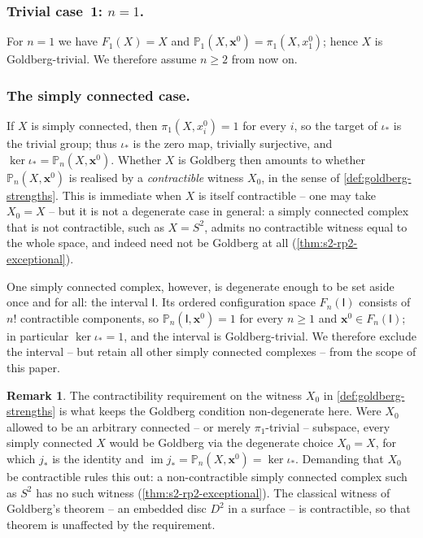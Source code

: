 \documentclass[reqno]{amsart}
\theoremstyle{definition}
\newtheorem{remark}[theorem]{Remark}
\newcommand\bfx{\mathbf{x}}
\newcommand{\PB}{\mathbb{P}}
\newcommand{\im}{\operatorname{im}}
\newcommand{\base}{\bfx^0}
\numberwithin{equation}{section}
\begin{document}
\subsubsection{Trivial case~1: \(n = 1\).}\label{subsubsection:n-equals-one}

For \(n = 1\) we have \(F_1 (X) = X\) and
\(\PB_1(X,\base) = \pi_1(X,x_1^0)\); hence
\(X\) is Goldberg-trivial. We
therefore assume \(n\geq 2\) from now on.

\subsubsection{The simply connected case.}\label{subsubsection:simply-connected}

If \(X\) is simply connected, then \(\pi_1(X,x_i^0) = 1\) for every
\(i\), so the target of \(\iota_\ast\) is the trivial group; thus
\(\iota_\ast\) is the zero map, trivially surjective, and
\(\ker\iota_\ast = \PB_n(X,\base)\). Whether \(X\) is Goldberg then
amounts to whether \(\PB_n(X,\base)\) is realised by a
\emph{contractible} witness \(X_0\), in the sense of
\cref{def:goldberg-strengths}. This is immediate when
\(X\) is itself contractible -- one may take \(X_0 = X\) -- but it is
not a degenerate case in general: a simply connected complex that
is not contractible, such as \(X = S^2\), admits no contractible
witness equal to the whole space, and indeed need not be Goldberg
at all (\cref{thm:s2-rp2-exceptional}).

One simply connected complex, however, is degenerate enough to
be set aside once and for all: the interval \(\mathsf{I}\). Its
ordered configuration space \(F_n(\mathsf{I})\) consists of
\(n!\) contractible components, so \(\PB_n(\mathsf{I},\base)=1\)
for every \(n\geq1\) and \(\base\in F_n(\mathsf{I})\); in
particular \(\ker\iota_\ast=1\), and the interval is
Goldberg-trivial. We therefore exclude the interval -- but
retain all other simply connected complexes -- from the scope
of this paper.

\begin{remark}\label{rem:simpler-X0}
The contractibility requirement on the witness \(X_0\) in
\cref{def:goldberg-strengths} is what keeps the Goldberg
condition non-degenerate here. Were \(X_0\) allowed to be an
arbitrary connected -- or merely \(\pi_1\)-trivial -- subspace, every
simply connected \(X\) would be Goldberg via the degenerate
choice \(X_0 = X\), for which \(j_\ast\) is the identity and
\(\im j_\ast = \PB_n(X,\base) = \ker\iota_\ast\). Demanding that
\(X_0\) be contractible rules this out: a non-contractible simply
connected complex such as \(S^2\) has no such witness
(\cref{thm:s2-rp2-exceptional}). The classical witness of
Goldberg's theorem -- an embedded disc \(D^2\) in a surface -- is
contractible, so that theorem is unaffected by the requirement.
\end{remark}
\end{document}
